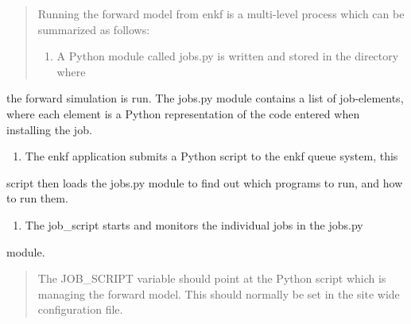 \documentclass[letterpaper,10pt,english]{sphinxmanual}
\begin{document}
\begin{sphinxShadowBox}
\begin{quote}

Running the forward model from enkf is a multi-level process which can be
summarized as follows:
\begin{enumerate}
\item {} 
A Python module called jobs.py is written and stored in the directory where

\end{enumerate}
\end{quote}

the forward simulation is run. The jobs.py module contains a list of
job-elements, where each element is a Python representation of the code
entered when installing the job.
\begin{enumerate}
\item {} 
The enkf application submits a Python script to the enkf queue system, this

\end{enumerate}

script then loads the jobs.py module to find out which programs to run, and
how to run them.
\begin{enumerate}
\item {} 
The job\_script starts and monitors the individual jobs in the jobs.py

\end{enumerate}

module.
\begin{quote}

The JOB\_SCRIPT variable should point at the Python script which is managing
the forward model. This should normally be set in the site wide configuration
file.
\end{quote}
\end{sphinxShadowBox}
\label{\detokenize{keywords/index:queue-system}}
\end{document}
